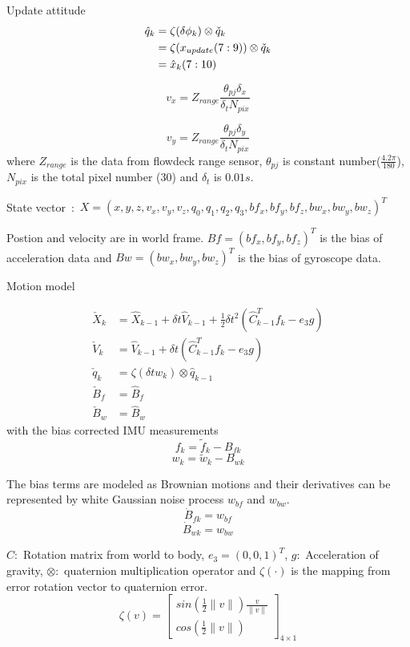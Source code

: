 \documentclass{cisXXX} %
\begin{document}
Update attitude
\begin{equation}
\begin{split}
\hat{q}_k &= \zeta(\delta \phi_k)\otimes \check{q}_k    \\
		  &= \zeta(x_{update}\tiny{(7:9)})\otimes \check{q}_k  \\
		  &= \hat{x}_k\small{(7:10)}
\end{split}
\end{equation}

\newpage
$$
v_x =Z_{range}\frac{\theta_{pj}\delta_x}{\delta_t N_{pix}}  
$$

$$ 
v_y =Z_{range}\frac{\theta_{pj}\delta_y}{\delta_t N_{pix}}   
$$
where $Z_{range}$ is the data from flowdeck range sensor, $\theta_{pj}$ is constant number($\frac{4.2\pi}{180}$), $N_{pix}$ is the total pixel number ($30$) and $\delta_t$ is $0.01s$.

\newpage

State vector~:~$X=(x,y,z,v_x,v_y,v_z,q_0,q_1,q_2,q_3,bf_x, bf_y, bf_z, bw_x, bw_y, bw_z)^T$

Postion and velocity are in world frame. $Bf=(bf_x, bf_y, bf_z)^T$ is the bias of acceleration data and $Bw=(bw_x, bw_y, bw_z)^T$ is the bias of gyroscope data.

Motion model

\begin{equation}
\begin{split}
\check{X}_k &= \hat{X}_{k-1}+\delta t\hat{V}_{k-1}+\frac{1}{2}\delta t^2\left(\hat{C}_{k-1}^T f_k-e_3g\right) \\
\check{V}_k &= \hat{V}_{k-1}+\delta t\left(\hat{C}_{k-1}^T f_k-e_3 g\right) \\
\check{q}_k &= \zeta\left(\delta t w_k\right)\otimes \hat{q}_{k-1}  \\
\check{B}_f &= \hat{B}_f   \\
\check{B}_w &= \hat{B}_w
\end{split}
\end{equation}
with the bias corrected IMU measurements 
$$
f_k=\tilde{f}_k-B_{fk}
$$
$$
w_k=\tilde{w}_k-B_{wk}
$$

The bias terms are modeled as Brownian motions and their derivatives can be represented by white Gaussian noise process $w_{bf}$ and $w_{bw}$.
$$
\dot{B}_{fk}=w_{bf}
$$
$$
\dot{B}_{wk}=w_{bw}
$$


 $C:$ Rotation matrix from world to body, $e_3=(0,0,1)^T$, $g:$ Acceleration of gravity, $\otimes:$ quaternion multiplication operator and $\zeta(\cdot)$ is the mapping from error rotation vector to quaternion error.
\begin{equation}
\renewcommand\arraystretch{1.7}
 \zeta(v)=\begin{bmatrix}
  sin\left(\frac{1}{2}\|v\|\right)\frac{v}{\|v\|}  \\
  cos\left(\frac{1}{2}\|v\|\right)
 \end{bmatrix}_{4\times 1} 
\end{equation} 
\end{document}
